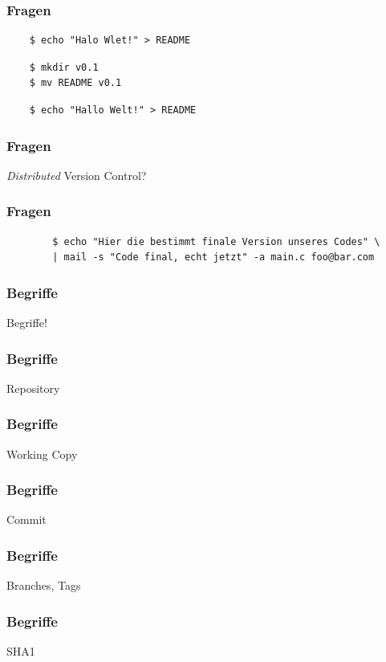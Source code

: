 \documentclass[]{beamer}
\begin{document}
\begin{frame}[fragile]
	\frametitle{Fragen}
	\begin{verbatim}
	$ echo "Halo Wlet!" > README
	\end{verbatim}

	\begin{verbatim}
	$ mkdir v0.1
	$ mv README v0.1
	\end{verbatim}

	\begin{verbatim}
	$ echo "Hallo Welt!" > README
	\end{verbatim}
\end{frame}

\begin{frame}
	\frametitle{Fragen}
	\Huge{\emph{Distributed} Version Control?}
\end{frame}

\begin{frame}[fragile]
	\frametitle{Fragen}
	\begin{verbatim}
		$ echo "Hier die bestimmt finale Version unseres Codes" \ 
		| mail -s "Code final, echt jetzt" -a main.c foo@bar.com
	\end{verbatim}
\end{frame}

\begin{frame}
	\frametitle{Begriffe}
	\Huge{Begriffe!}\\
	\only<2>{\fontsize{20}{10}\selectfont yay!}
\end{frame}

\begin{frame}
	\frametitle{Begriffe}
	\Huge{Repository}
\end{frame}

\begin{frame}
	\frametitle{Begriffe}
	\Huge{Working Copy}
\end{frame}

\begin{frame}
	\frametitle{Begriffe}
	\Huge{Commit}
\end{frame}

\begin{frame}
	\frametitle{Begriffe}
	\Huge{Branches, Tags}
\end{frame}

\begin{frame}
	\frametitle{Begriffe}
	\Huge{SHA1}
\end{frame}
\end{document}
